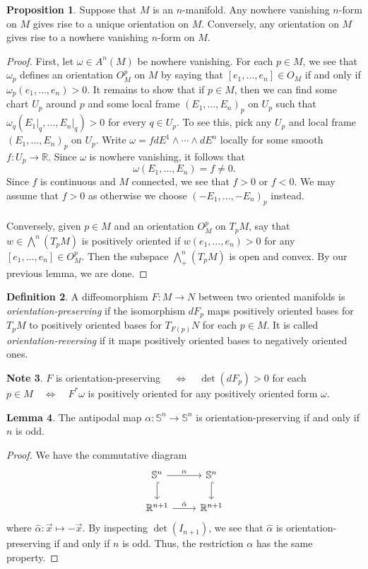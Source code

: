 \documentclass[10pt,letterpaper,cm]{nupset}
\theoremstyle{definition}
\newtheorem{definition}{Definition}[subsection]
\newtheorem{note}[definition]{Note}
\theoremstyle{theorem}
\newtheorem{lemma}[definition]{Lemma}
\newtheorem{prop}[definition]{Proposition}
\theoremstyle{remark}
\newcommand{\R}{\mathbb R}
\renewcommand{\S}{\mathbb S}
\newcommand{\1}{\mathbf{1}}
\newcommand{\x}{\vec x}
\newcommand{\0}{\vec 0}
\begin{document}
\begin{prop}
Suppose that $M$ is an $n$-manifold. Any nowhere vanishing $n$-form on $M$ gives rise to a unique orientation on $M$. Conversely, any orientation on $M$ gives rise to a nowhere vanishing $n$-form on $M$.
\end{prop}
\begin{proof}
First, let $\omega \in A^n(M)$ be nowhere vanishing. For each $p \in M$, we see that $\omega_p$ defines an orientation $O_M^p$ on $M$ by saying that $[e_1, \ldots, e_n] \in  O_M$ if and only if $\omega_p(e_1, \ldots, e_n) >0$. It remains to show that if $p\in M$, then we can find some chart $U_p$ around $p$ and some local frame $(E_1, \ldots, E_n)_p$ on $U_p$ such that $\omega_q(E_1\rvert_q, \ldots, E_n\rvert_q) >0$ for every $q \in U_p$. To see this, pick any $U_p$ and local frame $(E_1, \ldots, E_n)_p$ on $U_p$. Write $\omega = fdE^1 \wedge \cdots \wedge dE^n$ locally for some smooth $f: U_p \to \R$. Since $\omega$ is nowhere vanishing, it follows that $$\omega(E_1, \ldots, E_n) = f \ne 0.$$ Since $f$ is continuous and $M$ connected, we see that $f>0$ or $f<0$. We may assume that $f>0$ as otherwise we choose $(-E_1, \ldots, -E_n)_p$ instead. 
\\ \\
Conversely, given $p\in M$ and an orientation $O_M^p$ on $T_pM$, say that $w \in \bigwedge^n(T_pM)$ is positively oriented if $w(e_1, \ldots, e_n) >0$ for any $[e_1, \ldots, e_n] \in O_M^p$. Then the subspace $\bigwedge^n_+(T_pM)$ is open and convex. By our previous lemma, we are done.
\end{proof}

\begin{definition}
A diffeomorphism $F: M \to N$ between two oriented manifolds is \textit{orientation-preserving} if the isomorphism $dF_p$ maps positively oriented bases for $T_pM$ to positively oriented bases for $T_{F(p)}N$ for each $p\in M$. It is called \textit{orientation-reversing} if it maps positively oriented bases to negatively oriented ones.
\end{definition}

\begin{note}
$F$ is orientation-preserving $\quad \iff \quad  \det(dF_p) >0$ for each $p \in M \quad \iff \quad F^{\ast}\omega$ is positively oriented for any positively oriented form $\omega$.
\end{note}

\begin{lemma}
The antipodal map $\alpha : \S^n \to \S^n$ is orientation-preserving  if and only if $n$ is odd.
\end{lemma}
\begin{proof}
We have the commutative diagram
\[
\begin{tikzcd}
\S^n \arrow[r, "\alpha"] \arrow[d, hook] & \S^n \arrow[d, hook] \\
\R^{n+1} \arrow[r, "\hat{\alpha}"] & \R^{n+1}
\end{tikzcd}
\]
where $\hat{\alpha} : \x \mapsto -\x$. By inspecting $\det(I_{n+1})$, we see that $\hat{\alpha}$ is orientation-preserving  if and only if $n$ is odd. Thus, the restriction $\alpha$ has the same property.
\end{proof}
\end{document}
